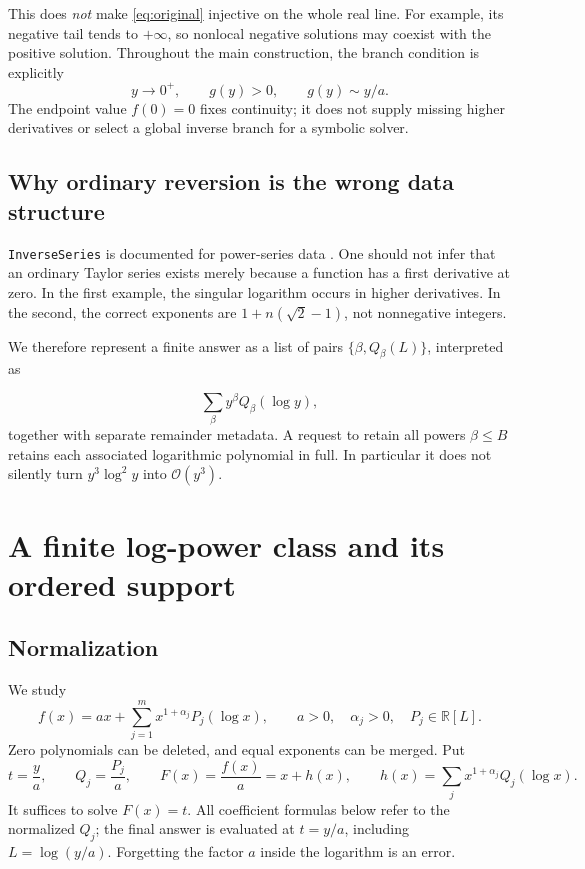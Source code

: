 \documentclass[11pt,a4paper]{article}
\newcommand{\R}{\mathbb R}
\newcommand{\OO}{\mathcal O}
\theoremstyle{definition}
\begin{document}
This does \emph{not} make \eqref{eq:original} injective on the whole real line.
For example, its negative tail tends to \(+\infty\), so nonlocal negative
solutions may coexist with the positive solution. Throughout the main
construction, the branch condition is explicitly
\begin{equation}\label{eq:branch}
 y\to0^+,
 \qquad g(y)>0,
 \qquad g(y)\sim y/a.
\end{equation}
The endpoint value \(f(0)=0\) fixes continuity; it does not supply missing
higher derivatives or select a global inverse branch for a symbolic solver.

\subsection{Why ordinary reversion is the wrong data structure}
\texttt{InverseSeries} is documented for power-series data \cite{inverseseries}.
One should not infer that an ordinary Taylor series exists merely because a
function has a first derivative at zero. In the first example, the singular
logarithm occurs in higher derivatives. In the second, the correct exponents
are \(1+n(\sqrt2-1)\), not nonnegative integers.

We therefore represent a finite answer as a list of pairs
\(\{\beta,Q_\beta(L)\}\), interpreted as

\[\sum_\beta y^\beta Q_\beta(\log y),\]
together with separate remainder metadata. A request to retain all powers \(\beta\le B\) retains each associated
logarithmic polynomial in full. In particular it does not silently turn
\(y^3\log^2 y\) into \(\OO(y^3)\).

\section{A finite log-power class and its ordered support}
\subsection{Normalization}
We study
\begin{equation}\label{eq:class}
 f(x)=a x+\sum_{j=1}^{m}x^{1+\alpha_j}P_j(\log x),
 \qquad a>0,\quad \alpha_j>0,\quad P_j\in\R[L].
\end{equation}
Zero polynomials can be deleted, and equal exponents can be merged. Put
\begin{equation}\label{eq:normalization}
 t=\frac ya,\qquad Q_j=\frac{P_j}{a},\qquad
 F(x)=\frac{f(x)}a=x+h(x),\qquad
 h(x)=\sum_j x^{1+\alpha_j}Q_j(\log x).
\end{equation}
It suffices to solve \(F(x)=t\). All coefficient formulas below refer to the
normalized \(Q_j\); the final answer is evaluated at \(t=y/a\), including
\(L=\log(y/a)\). Forgetting the factor \(a\) inside the logarithm is an error.
\end{document}
